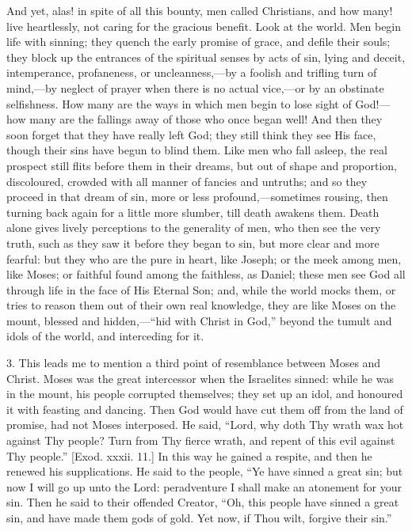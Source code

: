 And yet, alas! in spite of all this bounty, men called Christians,
and how many! live heartlessly, not caring for the gracious benefit.
Look at the world. Men begin life with sinning; they quench the early
promise of grace, and defile their souls; they block up the entrances
of the spiritual senses by acts of sin, lying and deceit,
intemperance, profaneness, or uncleanness,—by a foolish and trifling
turn of mind,—by neglect of prayer when there is no actual vice,—or
by an obstinate selfishness. How many are the ways in which men begin
to lose sight of God!—how many are the fallings away of those who
once began well! And then they soon forget that they have really left
God; they still think they see His face, though their sins have begun
to blind them. Like men who fall asleep, the real prospect still flits
before them in their dreams, but out of shape and proportion,
discoloured, crowded with all manner of fancies and untruths; and so
they proceed in that dream of sin, more or less profound,—sometimes
rousing, then turning back again for a little more slumber, till death
awakens them. Death alone gives lively perceptions to the generality
of men, who then see the very truth, such as they saw it before they
began to sin, but more clear and more fearful: but they who are the
pure in heart, like Joseph; or the meek among men, like Moses; or
faithful found among the faithless, as Daniel; these men see God all
through life in the face of His Eternal Son; and, while the world
mocks them, or tries to reason them out of their own real knowledge,
they are like Moses on the mount, blessed and hidden,—``hid with
Christ in God,'' beyond the tumult and idols of the world, and
interceding for it.

3. This leads me to mention a third point of resemblance between
Moses and Christ. Moses was the great intercessor when the Israelites
sinned: while he was in the mount, his people corrupted themselves;
they set up an idol, and honoured it with feasting and dancing. Then
God would have cut them off from the land of promise, had not Moses
interposed. He said, ``Lord, why doth Thy wrath wax hot against
Thy people? Turn from Thy fierce wrath, and repent of this evil
against Thy people.'' [Exod. xxxii. 11.] In this way he gained a
respite, and then he renewed his supplications. He said to the people,
``Ye have sinned a great sin; but now I will go up unto the Lord:
peradventure I shall make an atonement for your sin. Then he said to
their offended Creator, ``Oh, this people have sinned a great sin,
and have made them gods of gold. Yet now, if Thou wilt, forgive their
sin.''

